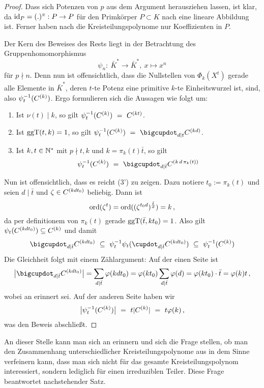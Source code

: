 \begin{proof}
  Dass sich Potenzen von $p$ aus dem Argument herausziehen lassen, ist klar,
  da $\operatorname{id}_P = (.)^\pi: P \to P$ für den Primkörper $P \subset K$ nach 
   eine lineare Abbildung ist. 
  Ferner haben nach  die
  Kreisteilungspolynome nur Koeffizienten in $P$.

  Der Kern des Beweises des Rests liegt in der Betrachtung des 
  Gruppenhomomorphismus
  \[ \psi_n:\ \bar K^\ast \to \bar K^\ast,\ x \mapsto x^n\]
  für $p\nmid n$. Denn nun ist offensichtlich, dass die Nullstellen von 
  $\Phi_k(X^t)$ gerade alle Elemente in $\bar K^\ast$, deren $t$-te Potenz
  eine primitive $k$-te Einheitswurzel ist, sind, also $\psi_t^{-1}(C^{(k)})$.
  Ergo formulieren sich die Aussagen wie folgt um:
  \begin{enumerate}[label=(\arabic*')]
    \item Ist $\nu(t) \mid k$, so gilt
      $\psi_t^{-1}(C^{(k)}) \ =\  C^{(kt)}$.
    \item Ist $\operatorname{ggT}(t,k)=1$, so gilt
      $\psi_t\inv(C\kl k) \speq= \bigcupdot_{d\mid t} C\kl{kd}$.
    \item Ist $k,t\in \mathbb{N}^\ast$ mit $p\nmid t,k$ und $k = \pi_k(t) \bar t$,
      so gilt
      \[ \psi_t\inv(C\kl k) \speq= 
        \bigcupdot_{d\mid \bar t} C\kl{k\,d\,\pi_k(t)}\]
  \end{enumerate}
  Nun ist offensichtlich, dass es reicht (3') zu zeigen. 
  Dazu notiere $t_0 := \pi_k(t)$ und seien $d\mid \bar t$ 
  und $\zeta \in C^{(kd t_0)}$ beliebig. Dann ist 
  \[ \operatorname{ord}(\zeta^t) = \operatorname{ord}((\zeta^{t_0d})^{\frac{\bar t}{d}})
    = k\,,\]
  da per definitionem von $\pi_k(t)$ gerade $\operatorname{ggT}(\bar t, kt_0) = 1$.
  Also gilt $\psi_t(C^{(kdt_0)}) \subseteq C^{(k)}$
  und damit
  \[ \bigcupdot_{d\mid \bar t} C\kl{kdt_0} \speq\subseteq 
    \psi_t\inv \psi_t ( \cupdot_{d\mid \bar t} C\kl{kdt_0}) 
    \speq\subseteq \psi_t\inv(C\kl k)\]
  Die Gleichheit folgt mit einem Zählargument:
  Auf der einen Seite ist
  \[ \big|\bigcupdot_{d\mid \bar t} C\kl{kdt_0}\big| = 
    \sum_{d\mid \bar t} \varphi(kdt_0) = 
    \varphi(kt_0)\sum_{d\mid \bar t}\varphi(d) = \varphi(kt_0) \cdot \bar t
     = \varphi(k)t\,,\]
  wobei an  erinnert sei.
  Auf der anderen Seite haben wir
  \[ \big| \psi_t^{-1}(C ^{(k)})\big| \ =\  t |C^{(k)}| \ =\  t \varphi(k)\,,\]
  was den Beweis abschließt.
\end{proof}

An dieser Stelle kann man sich an 
erinnern und sich die Frage stellen, ob man den
Zusammenhang unterschiedlicher Kreisteilungspolynome aus 
in dem Sinne verfeinern kann, dass man sich nicht für das gesamte 
Kreisteilungspolynom interessiert, sondern lediglich für einen irreduziblen
Teiler. Diese Frage beantwortet nachstehender Satz.


